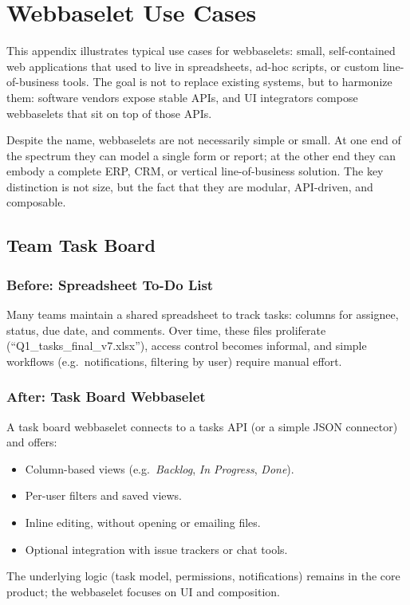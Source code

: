 \chapter{Webbaselet Use Cases}
\label{app:usecases}

This appendix illustrates typical use cases for webbaselets:
small, self-contained web applications that used to live in
spreadsheets, ad-hoc scripts, or custom line-of-business tools.
The goal is not to replace existing systems, but to harmonize them:
software vendors expose stable APIs, and UI integrators compose
webbaselets that sit on top of those APIs.

Despite the name, webbaselets are not necessarily simple or small.
At one end of the spectrum they can model a single form or report;
at the other end they can embody a complete ERP, CRM, or vertical
line-of-business solution. The key distinction is not size, but the
fact that they are modular, API-driven, and composable.

\section{Team Task Board}

\subsection*{Before: Spreadsheet To-Do List}
Many teams maintain a shared spreadsheet to track tasks:
columns for assignee, status, due date, and comments. Over time,
these files proliferate (``Q1\_tasks\_final\_v7.xlsx''), access
control becomes informal, and simple workflows (e.g.\ notifications,
filtering by user) require manual effort.

\subsection*{After: Task Board Webbaselet}
A task board webbaselet connects to a tasks API (or a simple JSON
connector) and offers:
\begin{itemize}
  \item Column-based views (e.g.\ \emph{Backlog}, \emph{In Progress}, \emph{Done}).
  \item Per-user filters and saved views.
  \item Inline editing, without opening or emailing files.
  \item Optional integration with issue trackers or chat tools.
\end{itemize}
The underlying logic (task model, permissions, notifications)
remains in the core product; the webbaselet focuses on UI and
composition.

